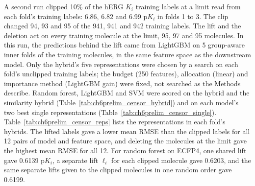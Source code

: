 A second run clipped 10\% of the hERG $K_i$ training labels at a limit read from each fold's training labels: 6.86, 6.82 and 6.99 p$K_i$ in folds 1 to 3. The clip changed 94, 93 and 95 of the 941, 941 and 942 training labels. The lift and the deletion act on every training molecule at the limit, 95, 97 and 95 molecules. In this run, the predictions behind the lift came from LightGBM on 5 group-aware inner folds of the training molecules, in the same feature space as the downstream model. Only the hybrid's five representations were chosen by a search on each fold's unclipped training labels; the budget (250 features), allocation (linear) and importance method (LightGBM gain) were fixed, not searched as the Methods describe. Random forest, LightGBM and SVM were scored on the hybrid and the similarity hybrid (Table~\ref{tab:ch6prelim_censor_hybrid}) and on each model's two best single representations (Table~\ref{tab:ch6prelim_censor_single}). Table~\ref{tab:ch6prelim_censor_reps} lists the representations in each fold's hybrids. The lifted labels gave a lower mean RMSE than the clipped labels for all 12 pairs of model and feature space, and deleting the molecules at the limit gave the highest mean RMSE for all 12. For random forest on ECFP4, one shared lift gave 0.6139 p$K_i$, a separate lift $\ell_i$ for each clipped molecule gave 0.6203, and the same separate lifts given to the clipped molecules in one random order gave 0.6199.


